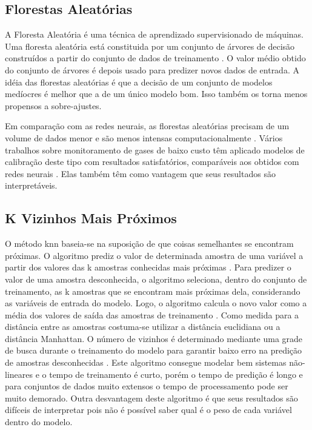 \subsection{Florestas Aleatórias}

A Floresta Aleatória é uma técnica de aprendizado supervisionado de máquinas. Uma floresta aleatória está constituida por um conjunto de árvores de decisão construídos a partir do conjunto de dados de treinamento \cite{geron2019maos}. O valor médio obtido do conjunto de árvores é depois usado para predizer novos dados de entrada. A idéia das florestas aleatórias é que a decisão de um conjunto de modelos medíocres é melhor que a de um único modelo bom. Isso também os torna menos propensos a sobre-ajustes.

Em comparação com as redes neurais, as florestas aleatórias precisam de um volume de dados menor e são menos intensas computacionalmente \cite{Montantes20203Science}. Vários trabalhos sobre monitoramento de gases de baixo custo têm aplicado modelos de calibração deste tipo com resultados satisfatórios, comparáveis aos obtidos com redes neurais \cite{Karagulian2019ReviewMonitoring}. Elas também têm como vantagem que seus resultados são interpretáveis.

\subsection{K Vizinhos Mais Próximos}

O método \gls{knn} baseia-se na suposição de que coisas semelhantes se encontram próximas. O algoritmo prediz o valor de determinada amostra de uma variável a partir dos valores das k amostras conhecidas mais próximas \cite{Altman1992AnRegression}. Para predizer o valor de uma amostra desconhecida, o algoritmo seleciona, dentro do conjunto de treinamento, as k amostras que se encontram mais próximas dela, considerando as variáveis de entrada do modelo. Logo, o algoritmo calcula o novo valor como a média dos valores de saída das amostras de treinamento \cite{Kramer2013K-NearestNeighbors}. Como medida para a distância entre as amostras costuma-se utilizar a distância euclidiana ou a distância Manhattan. O número de vizinhos é determinado mediante uma grade de busca durante o treinamento do modelo para garantir baixo erro na predição de amostras desconhecidas \cite{Miller2019TheScience}. Este algoritmo consegue modelar bem sistemas não-lineares e o tempo de treinamento é curto, porém o tempo de predição é longo e para conjuntos de dados muito extensos o tempo de processamento pode ser muito demorado. Outra desvantagem deste algoritmo é que seus resultados são difíceis de interpretar pois não é possível saber qual é o peso de cada variável dentro do modelo.


